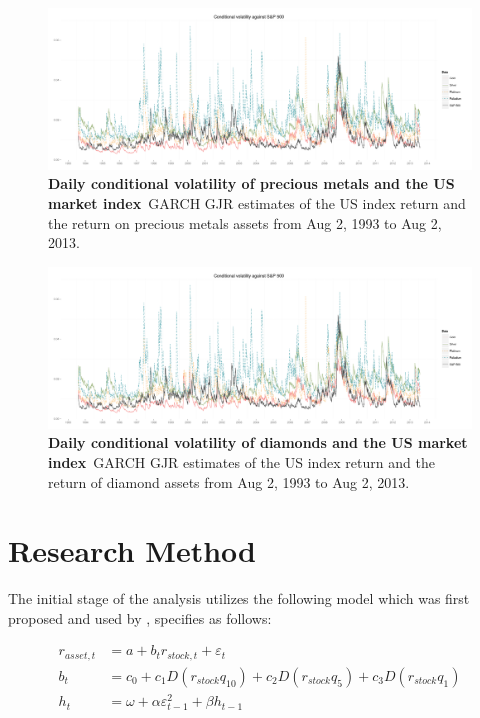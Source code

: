 \documentclass[preprint,authoryear,11pt]{elsarticle}
\begin{document}
\begin{figure}
	\centering
	\includegraphics[scale=0.34]{sp500Plot}
	\caption{\textbf{Daily conditional volatility of precious metals and the US market index}\
	 GARCH GJR estimates of the US index return and the return on precious metals assets from Aug 2, 1993 to Aug 2, 2013. }
	\label{fig:sp500Plot}
\end{figure}

\begin{figure}
	\centering
	\includegraphics[scale=0.34]{sp500Plot}
	\caption{\textbf{Daily conditional volatility of diamonds and the US market index}\
	 GARCH GJR estimates of the US index return and the return of diamond assets from Aug 2, 1993 to Aug 2, 2013. }
	\label{fig:sp500Plot}
\end{figure}

\section{Research Method}
\label{sec:research_method}


The initial stage of the analysis utilizes the following model which was first proposed and used by \citet{baur_is_2010}, specifies as follows:

\begin{align}
	 r_{asset,t} &= a + b_{t}r_{stock,t} + \varepsilon_{t} \label{eq:mean_equation}\\
	 b_{t} &= c_{0} + c_{1}D(r_{stock}q_{10}) + c_{2}D(r_{stock}q_{5}) + c_{3}D(r_{stock}q_{1}) \label{eq:bt}\\
	 h_{t} &= \omega + \alpha\varepsilon_{t-1}^2 + \beta h_{t-1} \label{eq:garch11}
\end{align}
\end{document}

